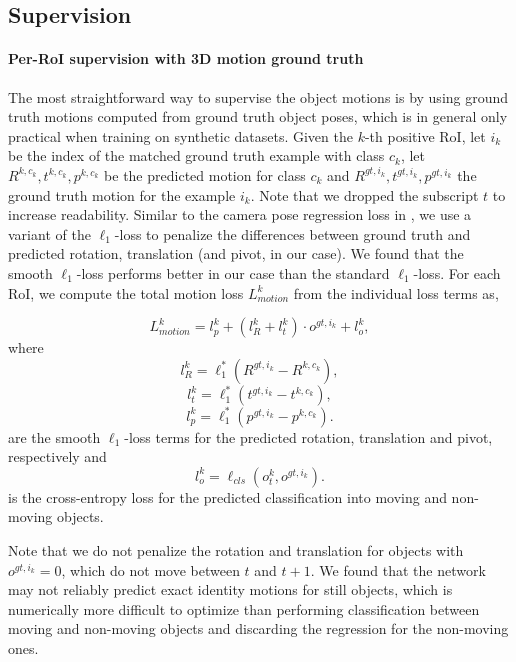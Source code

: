 \subsection{Supervision}
\label{ssec:supervision}

\paragraph{Per-RoI supervision with 3D motion ground truth}
The most straightforward way to supervise the object motions is by using ground truth
motions computed from ground truth object poses, which is in general
only practical when training on synthetic datasets.
Given the $k$-th positive RoI, let $i_k$ be the index of the matched ground truth example with class $c_k$,
let $R^{k,c_k}, t^{k,c_k}, p^{k,c_k}$ be the predicted motion for class $c_k$
and $R^{gt,i_k}, t^{gt,i_k}, p^{gt,i_k}$ the ground truth motion for the example $i_k$.
Note that we dropped the subscript $t$ to increase readability.
Similar to the camera pose regression loss in \cite{PoseNet2},
we use a variant of the $\ell_1$-loss to penalize the differences between ground truth and predicted
rotation, translation (and pivot, in our case). We found that the smooth $\ell_1$-loss
performs better in our case than the standard $\ell_1$-loss.
For each RoI, we compute the total motion loss $L_{motion}^k$ from
the individual loss terms as,

\begin{equation}
L_{motion}^k =  l_{p}^k + (l_{R}^k + l_{t}^k) \cdot o^{gt,i_k} + l_o^k,
\end{equation}
where
\begin{equation}
l_{R}^k = \ell_1^* (R^{gt,i_k} - R^{k,c_k}),
\end{equation}
\begin{equation}
l_{t}^k = \ell_1^* (t^{gt,i_k} - t^{k,c_k}),
\end{equation}
\begin{equation}
l_{p}^k = \ell_1^* (p^{gt,i_k} - p^{k,c_k}).
\end{equation}
are the smooth $\ell_1$-loss terms for the predicted rotation, translation and pivot,
respectively and
\begin{equation}
l_o^k = \ell_{cls}(o_t^k, o^{gt,i_k}).
\end{equation}
is the cross-entropy loss for the predicted classification into moving and non-moving objects.

Note that we do not penalize the rotation and translation for objects with
$o^{gt,i_k} = 0$, which do not move between $t$ and $t+1$. We found that the network
may not reliably predict exact identity motions for still objects, which is
numerically more difficult to optimize than performing classification between
moving and non-moving objects and discarding the regression for the non-moving
ones.

